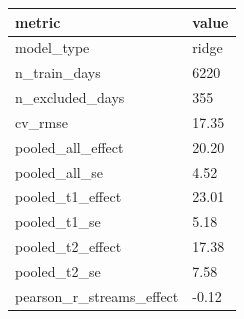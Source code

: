 \begin{tabular}{ll}
\toprule
metric & value \\
\midrule
model\_type & ridge \\
n\_train\_days & 6220 \\
n\_excluded\_days & 355 \\
cv\_rmse & 17.35 \\
pooled\_all\_effect & 20.20 \\
pooled\_all\_se & 4.52 \\
pooled\_t1\_effect & 23.01 \\
pooled\_t1\_se & 5.18 \\
pooled\_t2\_effect & 17.38 \\
pooled\_t2\_se & 7.58 \\
pearson\_r\_streams\_effect & -0.12 \\
\bottomrule
\end{tabular}
